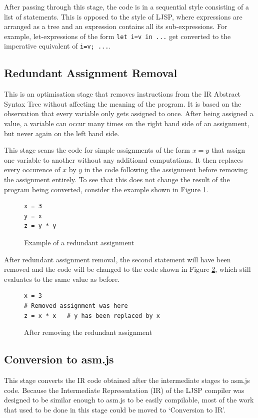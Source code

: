 \documentclass[11pt]{report}
\begin{document}
After passing through this stage, the code is in a sequential style consisting of a list of statements. This is opposed to the style of LJSP, where expressions are arranged as a tree and an expression contains all its sub-expressions. For example, let-expressions of the form \texttt{let i=v in ...} get converted to the imperative equivalent of \texttt{i=v; ...}.

\subsection{Redundant Assignment Removal}
This is an optimisation stage that removes instructions from the IR Abstract Syntax Tree without affecting the meaning of the program. It is based on the observation that every variable only gets assigned to once. After being assigned a value, a variable can occur many times on the right hand side of an assignment, but never again on the left hand side.

This stage scans the code for simple assignments of the form $x = y$ that assign one variable to another without any additional computations. It then replaces every occurence of $x$ by $y$ in the code following the assignment before removing the assignment entirely. To see that this does not change the result of the program being converted, consider the example shown in Figure \ref{redrem1}.
\begin{figure}[ht]
\begin{lstlisting}
x = 3
y = x
z = y * y
\end{lstlisting}
\caption{Example of a redundant assignment}
\label{redrem1}
\end{figure}

After redundant assignment removal, the second statement will have been removed and the code will be changed to the code shown in Figure \ref{redrem2}, which still evaluates to the same value as before.
\begin{figure}[ht]
\begin{lstlisting}
x = 3
# Removed assignment was here
z = x * x   # y has been replaced by x
\end{lstlisting}
\caption{After removing the redundant assignment}
\label{redrem2}
\end{figure}


\subsection{Conversion to asm.js}
This stage converts the IR code obtained after the intermediate stages to asm.js code. Because the Intermediate Representation (IR) of the LJSP compiler was designed to be similar enough to asm.js to be easily compilable, most of the work that used to be done in this stage could be moved to `Conversion to IR'.
\end{document}
